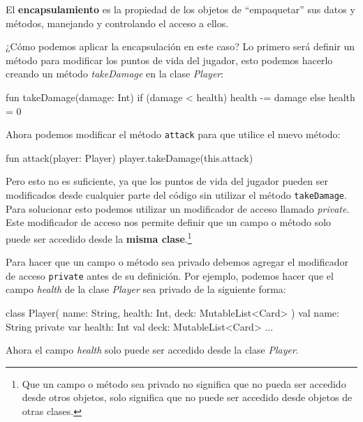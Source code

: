  \begin{defaultbox}[Encapsulamiento]
    El \textbf{encapsulamiento} es la propiedad de los objetos de \enquote{empaquetar} sus datos y 
    métodos, manejando y controlando el acceso a ellos.
  \end{defaultbox}

  ¿Cómo podemos aplicar la encapsulación en este caso?
  Lo primero será definir un método para modificar los puntos de vida del jugador, esto podemos
  hacerlo creando un método \textit{takeDamage} en la clase \textit{Player}:

  \begin{kotlin}
    fun takeDamage(damage: Int) {
      if (damage < health) {
        health -= damage
      } else {
        health = 0
      }
    }
  \end{kotlin}

  Ahora podemos modificar el método \texttt{attack} para que utilice el nuevo método:

  \begin{kotlin}
    fun attack(player: Player) {
      player.takeDamage(this.attack)
    }
  \end{kotlin}

  Pero esto no es suficiente, ya que los puntos de vida del jugador pueden ser modificados desde
  cualquier parte del código sin utilizar el método \texttt{takeDamage}.
  Para solucionar esto podemos utilizar un modificador de acceso llamado \textit{private}.
  Este modificador de acceso nos permite definir que un campo o método solo puede ser accedido
  desde la \textbf{misma clase}.\footnote{Que un campo o método sea privado no significa que no
  pueda ser accedido desde otros objetos, solo significa que no puede ser accedido desde objetos 
  de otras clases.}

  Para hacer que un campo o método sea privado debemos agregar el modificador de acceso
  \texttt{private} antes de su definición.
  Por ejemplo, podemos hacer que el campo \textit{health} de la clase \textit{Player} sea
  privado de la siguiente forma:

  \begin{kotlin}
    class Player(
      name: String,
      health: Int,
      deck: MutableList<Card>
    ) {
      val name: String
      private var health: Int
      val deck: MutableList<Card>
      ...
    }
  \end{kotlin}

  Ahora el campo \textit{health} solo puede ser accedido desde la clase \textit{Player}.

